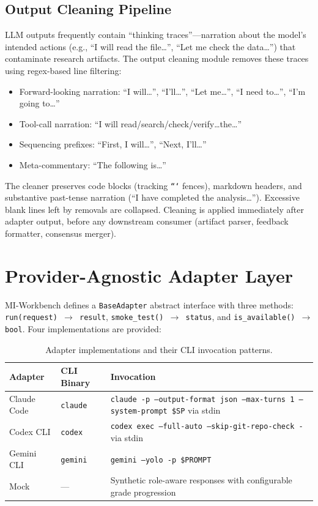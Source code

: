 \documentclass[11pt,a4paper]{article}
\begin{document}
\subsection{Output Cleaning Pipeline}

LLM outputs frequently contain ``thinking traces''---narration about the model's intended actions (e.g., ``I will read the file\ldots'', ``Let me check the data\ldots'') that contaminate research artifacts.
The output cleaning module removes these traces using regex-based line filtering:

\begin{itemize}[leftmargin=*]
  \item Forward-looking narration: ``I will\ldots'', ``I'll\ldots'', ``Let me\ldots'', ``I need to\ldots'', ``I'm going to\ldots''
  \item Tool-call narration: ``I will read/search/check/verify\ldots the\ldots''
  \item Sequencing prefixes: ``First, I will\ldots'', ``Next, I'll\ldots''
  \item Meta-commentary: ``The following is\ldots''
\end{itemize}

The cleaner preserves code blocks (tracking \texttt{```} fences), markdown headers, and substantive past-tense narration (``I have completed the analysis\ldots'').
Excessive blank lines left by removals are collapsed.
Cleaning is applied immediately after adapter output, before any downstream consumer (artifact parser, feedback formatter, consensus merger).


\section{Provider-Agnostic Adapter Layer}
\label{sec:adapters}

MI-Workbench defines a \texttt{BaseAdapter} abstract interface with three methods: \texttt{run(request) $\to$ result}, \texttt{smoke\_test() $\to$ status}, and \texttt{is\_available() $\to$ bool}.
Four implementations are provided:

\begin{table}[h]
\centering
\small
\caption{Adapter implementations and their CLI invocation patterns.}
\label{tab:adapters}
\begin{tabular}{@{}llp{6cm}@{}}
\toprule
\textbf{Adapter} & \textbf{CLI Binary} & \textbf{Invocation} \\
\midrule
Claude Code & \texttt{claude} & \texttt{claude -p --output-format json --max-turns 1 --system-prompt \$SP} via stdin \\
Codex CLI & \texttt{codex} & \texttt{codex exec --full-auto --skip-git-repo-check -} via stdin \\
Gemini CLI & \texttt{gemini} & \texttt{gemini --yolo -p \$PROMPT} \\
Mock & --- & Synthetic role-aware responses with configurable grade progression \\
\bottomrule
\end{tabular}
\end{table}
\end{document}
